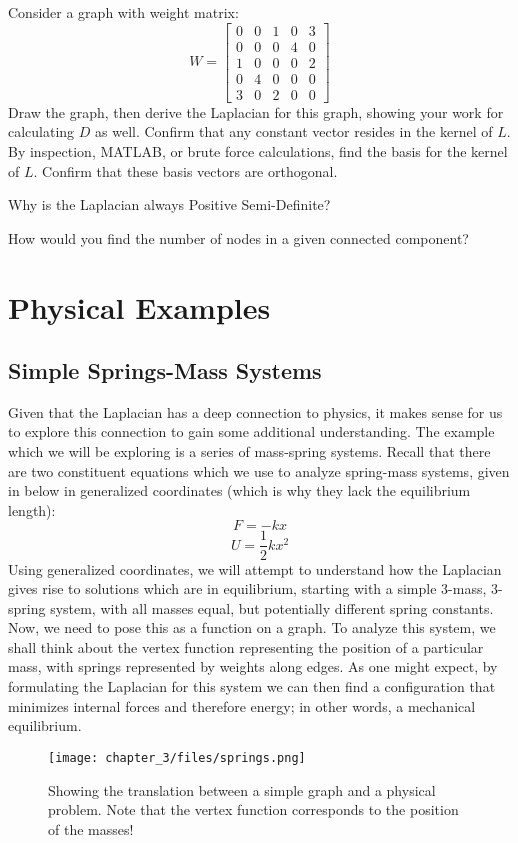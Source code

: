 \begin{exercise}
Consider a graph with weight matrix:
\[
W = 
\begin{bmatrix}
    0 & 0 & 1 & 0 & 3\\
    0 & 0 & 0 & 4 & 0\\
    1 & 0 & 0 & 0 & 2\\
    0 & 4 & 0 & 0 & 0\\
    3 & 0 & 2 & 0 & 0
\end{bmatrix}
\]
Draw the graph, then derive the Laplacian for this graph, showing your
work for calculating \(D\) as well. Confirm that any constant vector
resides in the kernel of \(L\). By inspection, MATLAB, or brute force
calculations, find the basis for the kernel of \(L\). Confirm that
these basis vectors are orthogonal. 
\end{exercise}
\begin{exercise} Why is the Laplacian always
  Positive Semi-Definite? 
\end{exercise}
\begin{exercise}
How would you find the number of nodes in a given connected component?
\end{exercise}

\section{Physical Examples}
\subsection{Simple Springs-Mass Systems}
Given that the Laplacian has a deep connection to physics, it makes
sense for us to explore this connection to gain some additional
understanding. The example which we will be exploring is a series of
mass-spring systems. Recall that there are two constituent equations
which we use to analyze spring-mass systems, given in below in
generalized coordinates (which is why they lack the equilibrium
length): 
\[
F = -kx
\]
\[
U = \frac{1}{2}kx^2
\]
Using generalized coordinates, we will attempt to understand how the
Laplacian gives rise to solutions which are in equilibrium, starting
with a simple 3-mass, 3-spring system, with all masses equal, but
potentially different spring constants. Now, we need to pose this as a
function on a graph. To analyze this system, we shall think about the
vertex function representing the position of a particular mass, with
springs represented by weights along edges. As one might expect, by
formulating the Laplacian for this system we can then find a
configuration that minimizes internal forces and therefore energy; in
other words, a mechanical equilibrium. 
\begin{figure}[ht]
\centering
\texttt{[image: chapter\_3/files/springs.png]}
\caption{Showing the translation between a simple graph and a physical
  problem. Note that the vertex function corresponds to the position
  of the masses!} 
\label{fig:springs}
\end{figure}


